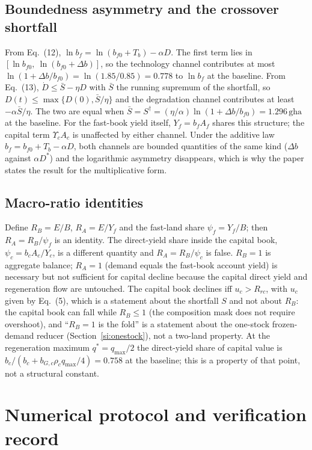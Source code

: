 \documentclass[11pt,a4paper]{article}
\newcommand{\Ups}{\Upsilon_c}
\begin{document}
\subsection{Boundedness asymmetry and the crossover shortfall}\label{si:bounded}

From Eq.~(12), $\ln b_f=\ln(b_{f0}+T_b)-\alpha D$. The first term lies in $[\ln b_{f0},\ \ln(b_{f0}+\Delta b)]$, so the technology channel contributes at most $\ln(1+\Delta b/b_{f0})=\ln(1.85/0.85)=0.778$ to $\ln b_f$ at the baseline. From Eq.~(13), $\dot D\le\bar S-\eta D$ with $\bar S$ the running supremum of the shortfall, so $D(t)\le\max\{D(0),\bar S/\eta\}$ and the degradation channel contributes at least $-\alpha\bar S/\eta$. The two are equal when $\bar S=S^\dagger=(\eta/\alpha)\ln(1+\Delta b/b_{f0})=1.296\,\mathrm{gha}$ at the baseline. For the fast-book yield itself, $Y_f=b_fA_f$ shares this structure; the capital term $\Ups A_c$ is unaffected by either channel. Under the additive law $b_f=b_{f0}+T_b-\alpha D$, both channels are bounded quantities of the same kind ($\Delta b$ against $\alpha D^*$) and the logarithmic asymmetry disappears, which is why the paper states the result for the multiplicative form.

\subsection{Macro-ratio identities}\label{si:ratios}

Define $R_B=E/B$, $R_A=E/Y_f$ and the fast-land share $\psi_f=Y_f/B$; then $R_A=R_B/\psi_f$ is an identity. The direct-yield share inside the capital book, $\psi_c=b_cA_c/Y_c$, is a different quantity and $R_A=R_B/\psi_c$ is false. $R_B=1$ is aggregate balance; $R_A=1$ (demand equals the fast-book account yield) is necessary but not sufficient for capital decline because the capital direct yield and regeneration flow are untouched. The capital book declines iff $u_c>R_{rc}$, with $u_c$ given by Eq.~(5), which is a statement about the shortfall $S$ and not about $R_B$: the capital book can fall while $R_B\le1$ (the composition mask does not require overshoot), and ``$R_B=1$ is the fold'' is a statement about the one-stock frozen-demand reducer (Section~\ref{si:onestock}), not a two-land property. At the regeneration maximum $q^*=q_{\max}/2$ the direct-yield share of capital value is $b_c/(b_c+b_{G,c}\rho_cq_{\max}/4)=0.758$ at the baseline; this is a property of that point, not a structural constant.
\section{Numerical protocol and verification record}\label{si:numerics}
\end{document}
